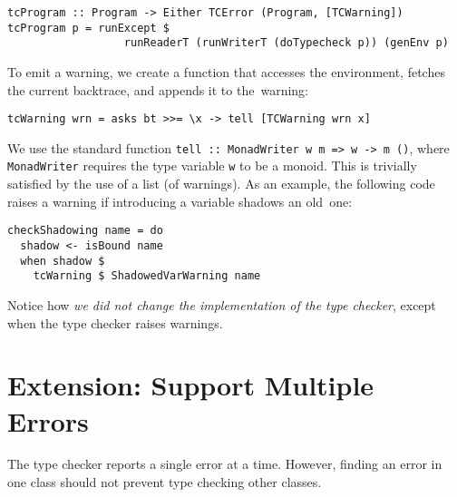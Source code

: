 \documentclass[sigplan,screen]{acmart}
\makeatletter
\newcommand{\ec}[1]{\lstinline[style=encore,breaklines=true,basicstyle=\fontsize{9}{9}\tt]@#1@}
\makeatother
\begin{document}
\begin{minipage}[t]{\linewidth}
\begin{lstlisting}[style=encore]
tcProgram :: Program -> Either TCError (Program, [TCWarning])
tcProgram p = runExcept $
                  runReaderT (runWriterT (doTypecheck p)) (genEnv p)
\end{lstlisting}
\end{minipage}

To emit a warning, we create a function that accesses the environment, fetches
the current backtrace, and appends it to the~warning:

\begin{minipage}[t]{\linewidth}
\begin{lstlisting}[style=encore]
tcWarning wrn = asks bt >>= \x -> tell [TCWarning wrn x]
\end{lstlisting}
\end{minipage}

We use the standard function \ec{tell :: MonadWriter w m => w -> m ()},
where \ec{MonadWriter} requires the type variable \ec{w} to
be a monoid. This is trivially satisfied by the use of a list (of warnings).
%
As an example, the following code raises a warning if introducing
a variable shadows an old~one:

\begin{minipage}[t]{\linewidth}
\begin{lstlisting}[style=encore]
checkShadowing name = do
  shadow <- isBound name
  when shadow $
    tcWarning $ ShadowedVarWarning name
\end{lstlisting}
\end{minipage}


Notice how \emph{we did not change the implementation of
the type checker}, except when the type checker raises warnings.

\section{Extension: Support Multiple Errors}
\label{sec:multiple errors}

The type checker reports a single error at a time.
However, finding an error in one class should not prevent type
checking other classes.
\end{document}
